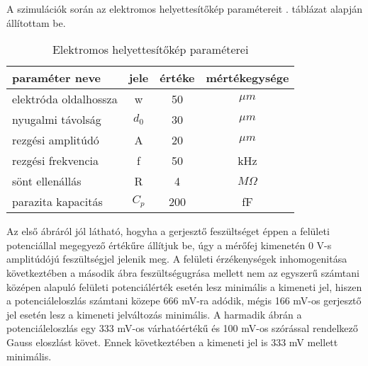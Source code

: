 A szimulációk során az elektromos helyettesítőkép paramétereit . táblázat alapján állítottam be.

\begin{table}[!ht]
    \centering%
    \begin{tabular}{@{}lccc@{}}
        \toprule
        \textbf{paraméter neve} & \textbf{jele} & \textbf{értéke} & \textbf{mértékegysége} \\
        \hline
        elektróda oldalhossza   & w             & 50              & $\mu m$                \\
        nyugalmi távolság       & $d_0$         & 30              & $\mu m$                \\
        rezgési amplitúdó       & A             & 20              & $\mu m$                \\
        rezgési frekvencia      & f             & 50              & kHz                    \\
        sönt ellenállás         & R             & 4               & $M \Omega$             \\
        parazita kapacitás      & $C_p$         & 200             & fF                     \\
        \bottomrule
    \end{tabular}
    \caption{Elektromos helyettesítőkép paraméterei}
    \label{tab:electronic_param}
\end{table}


Az első ábráról jól látható, hogyha a gerjesztő feszültséget éppen a felületi potenciállal megegyező értékűre állítjuk be, úgy a mérőfej kimenetén 0 V-s amplitúdójú feszültségjel jelenik meg. A felületi érzékenységek inhomogenitása következtében a második ábra feszültségugrása mellett nem az egyszerű számtani középen alapuló felületi potenciálérték esetén lesz minimális a kimeneti jel, hiszen a potenciáleloszlás számtani közepe 666 mV-ra adódik, mégis 166 mV-os gerjesztő jel esetén lesz a kimeneti jelváltozás minimális. A harmadik ábrán a potenciáleloszlás egy 333 mV-os várhatóértékű és 100 mV-os szórással rendelkező Gauss eloszlást követ. Ennek következtében a kimeneti jel is 333 mV mellett minimális.

